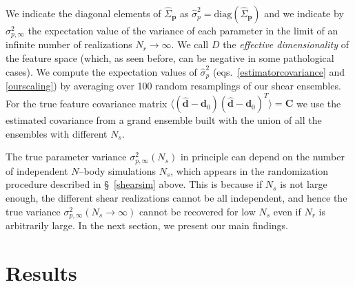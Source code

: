 \documentclass[reprint,aps,prd,superscriptaddress,showkeys,showpacs]{revtex4-1}
\newcommand{\bb}[1]{\mathbf{#1}}
\newcommand{\bbh}[1]{\mathbf{\hat{#1}}}
\newcommand{\h}[1]{\hat{#1}}
\begin{document}
%
We indicate the diagonal elements of $\h{\Sigma}_{\bb{p}}$ as
$\h{\sigma}^2_p=\mathrm{diag}(\h{\Sigma}_{\bb{p}})$ and we indicate by
$\sigma^2_{p,\infty}$ the expectation value of the variance of each
parameter in the limit of an infinite number of realizations
$N_r\rightarrow\infty$.  We call $D$ the \textit{effective
  dimensionality} of the feature space (which, as seen before, can be
negative in some pathological cases).  We compute the expectation
values of $\h{\sigma}^2_p$ (eqs.~\ref{estimatorcovariance} and
\ref{ourscaling}) by averaging over 100 random resamplings of our
shear ensembles. For the true feature covariance matrix
$\langle(\bbh{d}-\bb{d}_0)(\bbh{d}-\bb{d}_0)^T\rangle=\bb{C}$ we use
the estimated covariance from a grand ensemble built with the union of
all the ensembles with different $N_s$.

The true parameter variance $\sigma^2_{p,\infty}(N_s)$ in principle
can depend on the number of independent $N$--body simulations $N_s$,
which appears in the randomization procedure described in
\S~\ref{shearsim} above. This is because if $N_s$ is not large enough,
the different shear realizations cannot be all independent, and hence
the true variance $\sigma^2_{p,\infty}(N_s\rightarrow\infty)$ cannot
be recovered for low $N_s$ even if $N_r$ is arbitrarily large. In the
next section, we present our main findings.
 


\section{Results} 

\end{document}
